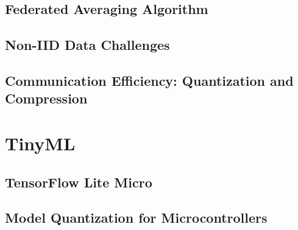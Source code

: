 \documentclass[12pt, a4paper, twoside, openright]{report}
\begin{document}
\subsection{Federated Averaging Algorithm}
\begin{algorithm}[H]
  \caption{\gls{fedavg}~\cite{mcmahan2017communication}}
  \label{alg:fedavg}
\end{algorithm}

\subsection{Non-IID Data Challenges}

\subsection{Communication Efficiency: Quantization and Compression}

\section{TinyML}
\label{sec:tinyml-theory}

\subsection{TensorFlow Lite Micro}

\subsection{Model Quantization for Microcontrollers}
\end{document}
